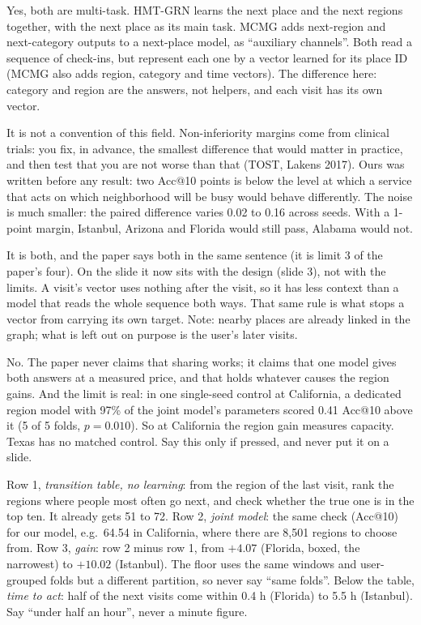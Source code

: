 Yes, both are multi-task. HMT-GRN learns the next place and the next regions together, with the next
place as its main task. MCMG adds next-region and next-category outputs to a next-place model, as
``auxiliary channels''. Both read a sequence of check-ins, but represent each one by a vector learned
for its place ID (MCMG also adds region, category and time vectors). The difference here: category and
region are the answers, not helpers, and each visit has its own vector.

It is not a convention of this field. Non-inferiority margins come from clinical trials: you fix, in
advance, the smallest difference that would matter in practice, and then test that you are not worse
than that (TOST, Lakens 2017). Ours was written before any result: two Acc@10 points is below the level
at which a service that acts on which neighborhood will be busy would behave differently. The noise is
much smaller: the paired difference varies 0.02 to 0.16 across seeds. With a 1-point margin, Istanbul,
Arizona and Florida would still pass, Alabama would not.

It is both, and the paper says both in the same sentence (it is limit 3 of the paper's four). On the
slide it now sits with the design (slide 3), not with the limits. A visit's vector uses nothing after the
visit, so it has less context than a model that reads the whole sequence both ways. That same rule is
what stops a vector from carrying its own target. Note: nearby places are already linked in the graph;
what is left out on purpose is the user's later visits.

No. The paper never claims that sharing works; it claims that one model gives both answers at a
measured price, and that holds whatever causes the region gains. And the limit is real: in one
single-seed control at California, a dedicated region model with 97\% of the joint model's parameters
scored 0.41 Acc@10 above it (5 of 5 folds, $p = 0.010$). So at California the region gain measures
capacity. Texas has no matched control. Say this only if pressed, and never put it on a slide.

Row 1, \emph{transition table, no learning}: from the region of the last visit, rank the regions where
people most often go next, and check whether the true one is in the top ten. It already gets 51 to 72.
Row 2, \emph{joint model}: the same check (Acc@10) for our model, e.g.\ 64.54 in California, where there
are 8,501 regions to choose from. Row 3, \emph{gain}: row 2 minus row 1, from $+4.07$ (Florida, boxed,
the narrowest) to $+10.02$ (Istanbul). The floor uses the same windows and user-grouped folds but a
different partition, so never say ``same folds''. Below the table, \emph{time to act}: half of the next
visits come within 0.4 h (Florida) to 5.5 h (Istanbul). Say ``under half an hour'', never a minute
figure.

